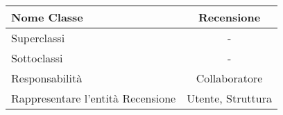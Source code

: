 
\setcounter{table}{0}
\begin{table}[H]
    \centering
    \begin{tabular}{||   l  ||  c   ||}
        \rowcolor{Gray}
        \hline
        Nome Classe & Recensione\\
        \hline
        Superclassi  &  - \\
        \hline
        Sottoclassi & - \\
        \hline
        \hline
         Responsabilità & Collaboratore \\
         \hline
          Rappresentare l'entità Recensione & Utente, Struttura \\
         \hline
    \end{tabular}
\end{table}

    
       
